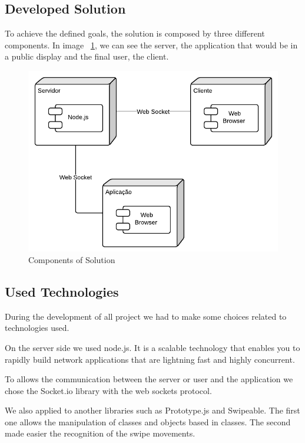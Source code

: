 \documentclass[9pt,a4paper]{extarticle}
\begin{document}
\begin{multicols}{2}
\section{Developed Solution}\label{sec:work}

To achieve the defined goals, the solution is composed by three different components. In image ~\ref{fig:componentes}, we can see the server, the application that would be in a public display and the final user, the client.

\begin{figure}[H]
\centerline{\includegraphics[scale=.5]{Components}}
\caption{Components of Solution}  
\label{fig:componentes}
\end{figure}

\subsection{Used Technologies}\label{sec:lingua}

During the development of all project we had to make some choices related to technologies used.

On the server side we used node.js. It is a scalable technology that enables you to rapidly build network applications that are lightning fast and highly concurrent.

To allows the communication between the server or user and the application we chose the Socket.io  library with the web sockets protocol.

We also applied to another libraries such as Prototype.js and Swipeable. The first one allows the manipulation of classes and objects based in classes. The second made easier the recognition of the swipe movements.


\end{multicols}
\end{document}
